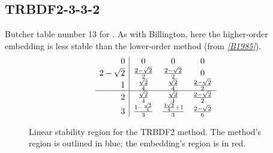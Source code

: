 \documentclass[letterpaper,10pt,english]{sphinxmanual}
\begin{document}
\subsection{TRBDF2-3-3-2}
\label{Butcher:butcher-trbdf2}\label{Butcher:trbdf2-3-3-2}
Butcher table number 13
for {\hyperref[c_interface/User_callable:c.ARKodeSetIRKTableNum]{\emph{}}}.  As with
Billington, here the higher-order embedding is less stable than the
lower-order method (from \label{Butcher:id12}{\hyperref[References:b1985]{\emph{{[}B1985{]}}}}).
\begin{gather}
\begin{split}\begin{array}{r|ccc}
  0 & 0 & 0 & 0 \\
  2-\sqrt{2} & \frac{2-\sqrt{2}}{2} & \frac{2-\sqrt{2}}{2} & 0 \\
  1 & \frac{\sqrt{2}}{4} & \frac{\sqrt{2}}{4} & \frac{2-\sqrt{2}}{2} \\
  \hline
  2 & \frac{\sqrt{2}}{4} & \frac{\sqrt{2}}{4} & \frac{2-\sqrt{2}}{2} \\
  3 & \frac{1-\frac{\sqrt{2}}{4}}{3} & \frac{\frac{3\sqrt{2}}{4}+1}{3} & \frac{2-\sqrt{2}}{6}
\end{array}\end{split}\notag
\end{gather}\begin{figure}[htbp]
\centering
\capstart

\caption{Linear stability region for the TRBDF2 method.  The method's
region is outlined in blue; the embedding's region is in red.}\end{figure}
\end{document}
